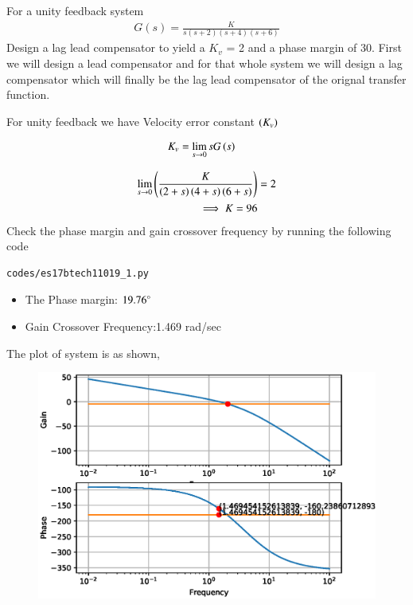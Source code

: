 
\item For a unity feedback system 
\begin{align}
G(s) =\frac{K}{s(s+2)(s+4)(s+6)}
\label{eq:es17btech11019_system1}
\end{align}
Design a lag lead compensator to yield a $K_v$ = 2 and a phase margin of 30\degree.
First we will design a lead compensator and for that whole system we will design a lag compensator which will finally be the lag lead compensator of the orignal transfer function.


\solution 
For unity feedback we have Velocity error constant $\left(K_v\right)$

\begin{align}
K_v &= \lim_{s \to 0} s G\left(s\right) 
\label{eq:es17btech11019_Kv}
\end{align}

\begin{align}
\lim_{s \to 0} \left(\frac{K}{\left(2+s\right)\left(4+s\right)\left(6+s\right)} \right)& = 2 
\\
\implies K = 96
\label{eq:es17btech11019_init_cond}
\end{align}
Check the phase margin and gain crossover frequency by running the following code
\begin{lstlisting}
codes/es17btech11019_1.py
\end{lstlisting}
\begin{itemize}
    \item The Phase margin: $19.76\degree$
    \item Gain Crossover Frequency:1.469  rad/sec
\end{itemize}
The plot of system is as shown,
\begin{figure}[!ht]
  \centering
  \includegraphics[width=\columnwidth]{./figs/es17btech11019_1.eps}
  \caption{}
  \label{fig:es17btech11019_1}
\end{figure}

